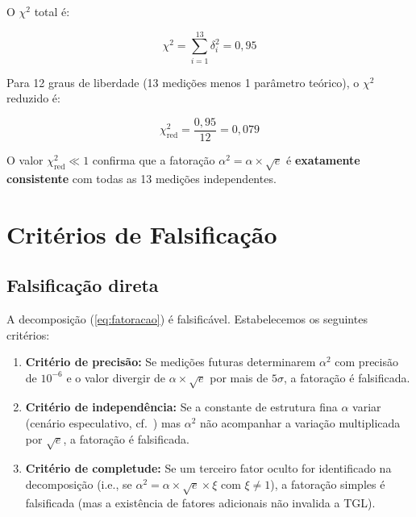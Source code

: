 \documentclass[12pt,a4paper,twoside]{article}
\newcommand{\alphaii}{\alpha^{2}}
\begin{document}
O $\chi^2$ total é:

\begin{equation}
\chi^2 = \sum_{i=1}^{13} \delta_i^2 = 0{,}95
\end{equation}

Para 12 graus de liberdade (13 medições menos 1 parâmetro teórico), o $\chi^2$ reduzido é:

\begin{equation}
\chi^2_{\text{red}} = \frac{0{,}95}{12} = 0{,}079
\end{equation}

O valor $\chi^2_{\text{red}} \ll 1$ confirma que a fatoração $\alphaii = \alpha \times \sqrt{e}$ é \textbf{exatamente consistente} com todas as 13 medições independentes.



\section{Critérios de Falsificação}
\label{sec:falsificacao}

\subsection{Falsificação direta}

A decomposição (\ref{eq:fatoracao}) é falsificável. Estabelecemos os seguintes critérios:

\begin{enumerate}[label=(\roman*)]
\item \textbf{Critério de precisão:} Se medições futuras determinarem $\alphaii$ com precisão de $10^{-6}$ e o valor divergir de $\alpha \times \sqrt{e}$ por mais de $5\sigma$, a fatoração é falsificada.

\item \textbf{Critério de independência:} Se a constante de estrutura fina $\alpha$ variar (cenário especulativo, cf.\ \cite{Webb2001}) mas $\alphaii$ não acompanhar a variação multiplicada por $\sqrt{e}$, a fatoração é falsificada.

\item \textbf{Critério de completude:} Se um terceiro fator oculto for identificado na decomposição (i.e., se $\alphaii = \alpha \times \sqrt{e} \times \xi$ com $\xi \neq 1$), a fatoração simples é falsificada (mas a existência de fatores adicionais não invalida a TGL).
\end{enumerate}
\end{document}
